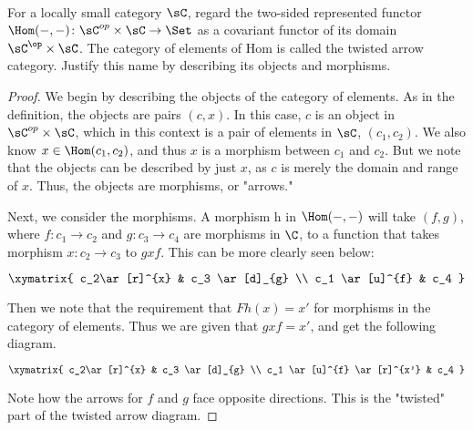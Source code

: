 \documentclass[main.tex]{subfiles}
\begin{document}
\paragraph{}

\begin{exercise}
For a locally small category $\sC$, regard the two-sided represented functor
$\Hom(-,-)\colon \sC^{op} \times \sC \rightarrow \Set$ as a covariant functor of its
domain $\sC^{\op} \times \sC$.  The category of elements of Hom is called the
twisted arrow category.  Justify this name by describing its objects and
morphisms.
\end{exercise}

\begin{proof}
We begin by describing the objects of the category of elements.  As in the
definition, the objects are pairs $(c,x)$.  In this case, $c$ is an object in
$\sC^{op} \times \sC$, which in this context is a pair of elements in $\sC$,
$(c_1,c_2)$.  We also know $x \in \Hom(c_1,c_2)$, and thus $x$ is a morphism
between $c_1$ and $c_2$.  But we note that the objects can be described by just
$x$, as $c$ is merely the domain and range of $x$.  Thus, the objects are
morphisms, or "arrows."

Next, we consider the morphisms.  A morphism h in $\Hom(-,-)$ will take
$(f,g)$, where $f\colon c_1 \rightarrow c_2$ and $g\colon c_3 \rightarrow c_4$ are
morphisms in $\C$, to a function that takes morphism $x\colon c_2 \rightarrow c_3$
to $gxf$.  This can be more clearly seen below:

$\xymatrix{ c_2\ar[r]^{x} & c_3 \ar[d]_{g} \\ c_1 \ar[u]^{f}  & c_4 }\\$ 

Then we note that the requirement that $Fh(x) = x'$ for morphisms in the category of elements.  Thus we are given that $gxf = x'$, and get the following diagram.

$\xymatrix{ c_2\ar[r]^{x} & c_3 \ar[d]_{g} \\ c_1 \ar[u]^{f} \ar[r]^{x'}  & c_4 }\\$ 

Note how the arrows for $f$ and $g$ face opposite directions.  This is the "twisted" part of the twisted arrow diagram.
\end{proof}
\end{document}

